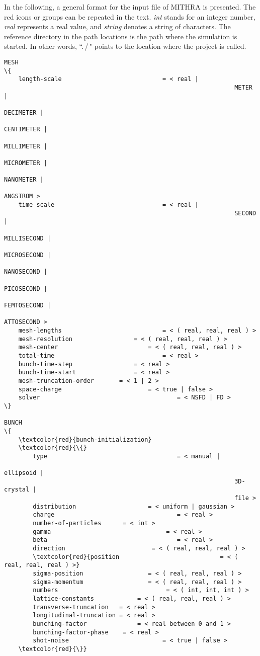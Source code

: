 \documentclass[9pt,a4paper]{article}
\begin{document}
\begin{landscape}
\begin{multicols}{3}
\setlength{\columnseprule}{0.1pt}
%
In the following, a general format for the input file of MITHRA is presented. The red icons or groups can be repeated in the text. \emph{int} stands for an integer number, \emph{real} represents a real value, and \emph{string} denotes a string of characters. The reference directory in the path locations is the path where the simulation is started. In other words, ``.\,/\," points to the location where the project is called.

\begin{Verbatim}[fontsize=\footnotesize, tabsize=2, fontfamily=courier,	fontseries=b, commandchars=\\\{\}]
MESH
\{
	length-scale							= < real | 
																METER | 
																DECIMETER | 
																CENTIMETER | 
																MILLIMETER | 
																MICROMETER |
																NANOMETER | 
																ANGSTROM >
	time-scale								= < real | 
																SECOND | 
																MILLISECOND | 
																MICROSECOND | 
																NANOSECOND | 
																PICOSECOND | 
																FEMTOSECOND | 
																ATTOSECOND >
	mesh-lengths							= < ( real, real, real ) >
	mesh-resolution		 			= < ( real, real, real ) >
	mesh-center				 			= < ( real, real, real ) >
	total-time								= < real >
	bunch-time-step		 			= < real >
	bunch-time-start  				= < real >
	mesh-truncation-order 		= < 1 | 2 >
	space-charge  						= < true | false >
	solver										= < NSFD | FD >
\}

BUNCH
\{
	\textcolor{red}{bunch-initialization}
	\textcolor{red}{\{}
		type  									= < manual | 
																ellipsoid | 
																3D-crystal | 
																file >
		distribution  					= < uniform | gaussian >
		charge  								= < real >
		number-of-particles  	 = < int >
		gamma  								 = < real >
		beta  									= < real >
		direction  						 = < ( real, real, real ) >
		\textcolor{red}{position  							= < ( real, real, real ) >}
		sigma-position  				= < ( real, real, real ) >
		sigma-momentum  				= < ( real, real, real ) >
		numbers								 = < ( int, int, int ) >
		lattice-constants			 = < ( real, real, real ) >
		transverse-truncation   = < real >
		longitudinal-truncation = < real >
		bunching-factor  			 = < real between 0 and 1 >
		bunching-factor-phase	 = < real >
		shot-noise  						= < true | false >
	\textcolor{red}{\}}


\end{Verbatim}
\end{multicols}
\end{landscape}
\end{document}
